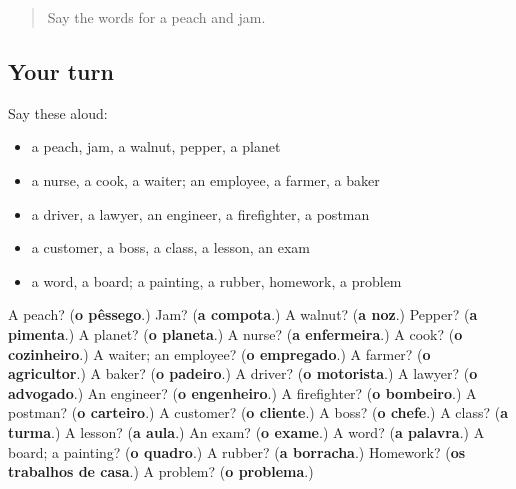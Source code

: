 \label{lesson:PT-R113-second-pass-free-time-and-nature}



\begin{quote}
Say the words for a peach and jam.
\end{quote}

\subsection*{Your turn}
Say these aloud:

\begin{itemize}
\raggedright
  \item a peach, jam, a walnut, pepper, a planet
  \item a nurse, a cook, a waiter; an employee, a farmer, a baker
  \item a driver, a lawyer, an engineer, a firefighter, a postman
  \item a customer, a boss, a class, a lesson, an exam
  \item a word, a board; a painting, a rubber, homework, a problem
\end{itemize}

\begin{tcolorbox}[breakable,colback=teal!4,colframe=teal!35!black,title={Before you move on}]
A peach? (\textbf{o pêssego}.) Jam? (\textbf{a compota}.) A walnut? (\textbf{a noz}.) Pepper? (\textbf{a pimenta}.) A planet? (\textbf{o planeta}.) A nurse? (\textbf{a enfermeira}.) A cook? (\textbf{o cozinheiro}.) A waiter; an employee? (\textbf{o empregado}.) A farmer? (\textbf{o agricultor}.) A baker? (\textbf{o padeiro}.) A driver? (\textbf{o motorista}.) A lawyer? (\textbf{o advogado}.) An engineer? (\textbf{o engenheiro}.) A firefighter? (\textbf{o bombeiro}.) A postman? (\textbf{o carteiro}.) A customer? (\textbf{o cliente}.) A boss? (\textbf{o chefe}.) A class? (\textbf{a turma}.) A lesson? (\textbf{a aula}.) An exam? (\textbf{o exame}.) A word? (\textbf{a palavra}.) A board; a painting? (\textbf{o quadro}.) A rubber? (\textbf{a borracha}.) Homework? (\textbf{os trabalhos de casa}.) A problem? (\textbf{o problema}.)
\end{tcolorbox}
